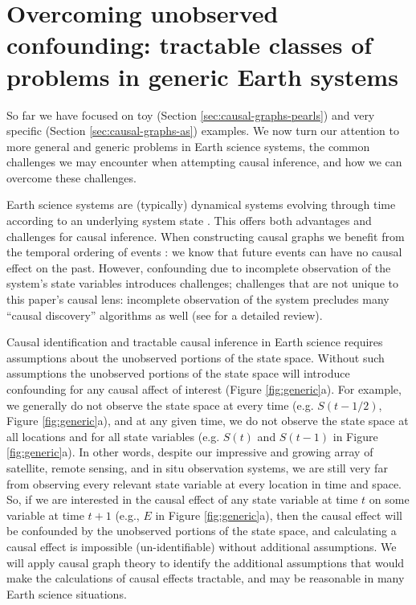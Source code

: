 \documentclass[12pt]{article}
\begin{document}
\section{Overcoming unobserved confounding: tractable classes of
  problems in generic Earth systems}
\label{sec:necess-cond-caus}

So far we have focused on toy (Section \ref{sec:causal-graphs-pearls})
and very specific (Section \ref{sec:causal-graphs-as}) examples. We
now turn our attention to more general and generic problems in Earth
science systems, the common challenges we may encounter when
attempting causal inference, and how we can overcome these challenges.

Earth science systems are (typically) dynamical systems evolving
through time according to an underlying system state
\citep{lorenz-1963,lorenz1996predictability,majda-state}. This offers
both advantages and challenges for causal inference. When constructing
causal graphs we benefit from the temporal ordering of events
\citep{runge2019inferring}: we know that future events can have no
causal effect on the past. However, confounding due to incomplete
observation of the system's state variables introduces challenges;
challenges that are not unique to this paper's causal lens: incomplete
observation of the system precludes many ``causal discovery''
algorithms as well (see \citet{runge2019inferring} for a detailed
review).

Causal identification and tractable causal inference in Earth science
requires assumptions about the unobserved portions of the state
space. Without such assumptions the unobserved portions of the state
space will introduce confounding for any causal affect of interest
(Figure \ref{fig:generic}a). For example, we generally do not observe
the state space at every time (e.g. $S(t-1/2)$, Figure
\ref{fig:generic}a), and at any given time, we do not observe the
state space at all locations and for all state variables (e.g. $S(t)$
and $S(t-1)$ in Figure \ref{fig:generic}a). In other words, despite
our impressive and growing array of satellite, remote sensing, and in
situ observation systems, we are still very far from observing every
relevant state variable at every location in time and space.  So, if
we are interested in the causal effect of any state variable at time
$t$ on some variable at time $t+1$ (e.g., $E$ in Figure
\ref{fig:generic}a), then the causal effect will be confounded by the
unobserved portions of the state space, and calculating a causal
effect is impossible (un-identifiable) without additional
assumptions. We will apply causal graph theory to identify the
additional assumptions that would make the calculations of causal
effects tractable, and may be reasonable in many Earth science
situations.
\end{document}
